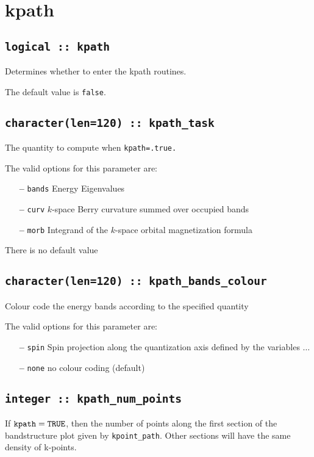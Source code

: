 \section{kpath}

\subsection[berry]{\tt logical :: kpath}
Determines whether to enter the kpath routines.

The default value is \verb#false#.


\subsection[kpath\_task]{\tt character(len=120) ::  kpath\_task} 
The quantity to compute when {\tt kpath=.true.} 

The valid options for this parameter are:
\begin{itemize}
\item[{\bf --}]  \verb#bands# Energy Eigenvalues
\item[{\bf --}] \verb#curv# $k$-space Berry curvature summed over
  occupied bands
\item[{\bf --}] \verb#morb#  Integrand of the $k$-space orbital
  magnetization formula
\end{itemize}
There is no default value

\subsection[kpath\_colour]{\tt character(len=120) ::  kpath\_bands\_colour}
Colour code the energy bands according to the specified quantity

The valid options for this parameter are:
\begin{itemize}
\item[{\bf --}]  \verb#spin# Spin projection along the quantization axis
defined by the variables $\ldots$
\item[{\bf --}]  \verb#none# no colour coding (default)
\end{itemize}


\subsection[kpath\_num\_points]{\tt integer :: kpath\_num\_points}

If $\verb#kpath#=\verb#TRUE#$, then the number of points along
the first section of the bandstructure plot given by
\verb#kpoint_path#. Other sections will have the same density of
k-points. 

